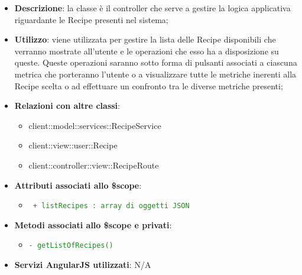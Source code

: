 			\begin{itemize}
				\item \textbf{Descrizione}: la classe è il controller che serve a gestire la logica applicativa riguardante le Recipe presenti nel sistema;
				\item \textbf{Utilizzo}: viene utilizzata per gestire la lista delle Recipe disponibili che verranno mostrate all'utente e le operazioni che esso ha a disposizione su queste. Queste operazioni saranno sotto forma di pulsanti associati a ciascuna metrica che porteranno l'utente o a visualizzare tutte le metriche inerenti alla Recipe scelta o ad effettuare un confronto tra le diverse metriche presenti;
				\item \textbf{Relazioni con altre classi}:
					\begin{itemize}
						\item client::model::services::RecipeService
						\item client::view::user::Recipe
						\item client::controller::view::RecipeRoute
					\end{itemize}

				\item \textbf{Attributi associati allo \$scope}:
					\begin{itemize}
						\item \textcolor{forestgreen}{\texttt{ + listRecipes : array di oggetti JSON}}

					\end{itemize}

				\item \textbf{Metodi associati allo \$scope e privati}:
					\begin{itemize}
						\item \textcolor{forestgreen}{\texttt{- getListOfRecipes()}}

					\end{itemize}

				\item \textbf{Servizi AngularJS utilizzati}: N/A

			\end{itemize}


